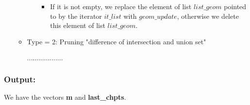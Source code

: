 \documentclass{report}
\begin{document}
\begin{itemize}
\begin{itemize}
\begin{itemize}
\begin{itemize}
				\item If it is not empty, we replace the element of list $list\_geom$ pointed to by the iterator $it\_list$  with $geom\_update$, otherwise we delete this element of list $list\_geom$.
			\end{itemize}			
		\end{itemize}
		
		\item Type = 2: Pruning "difference of intersection and union set"
		
		...................		
	\end{itemize}
\end{itemize}
\subsubsection*{Output:}

We have the vectors  {\bfseries m} and {\bfseries last\_chpts}.
	
\end{document}
